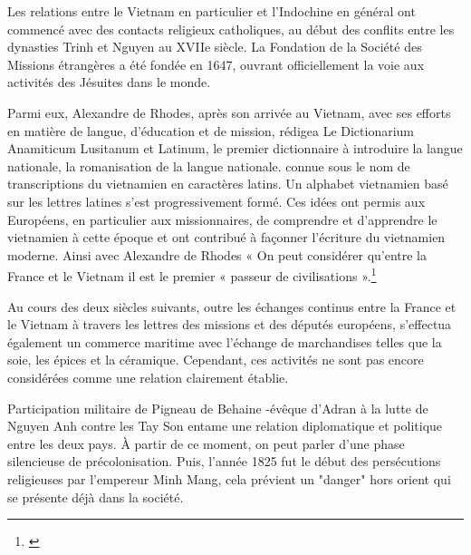 Les relations entre le Vietnam en particulier et l'Indochine en général ont commencé avec des contacts religieux catholiques, au début des conflits entre les dynasties Trinh et Nguyen au XVIIe siècle. La Fondation de la Société des Missions étrangères a été fondée en 1647, ouvrant officiellement la voie aux activités des Jésuites dans le monde.

Parmi eux, Alexandre de Rhodes, après son arrivée au Vietnam, avec ses efforts en matière de langue, d'éducation et de mission, rédigea Le Dictionarium Anamiticum Lusitanum et Latinum, le premier dictionnaire à introduire la langue nationale, la romanisation de la langue nationale. connue sous le nom de transcriptions du vietnamien en caractères latins. Un alphabet vietnamien basé sur les lettres latines s’est progressivement formé. Ces idées ont permis aux Européens, en particulier aux missionnaires, de comprendre et d’apprendre le vietnamien à cette époque et ont contribué à façonner l’écriture du vietnamien moderne. Ainsi avec Alexandre de Rhodes « On peut considérer qu’entre la France et le Vietnam il est le premier « passeur de civilisations ».\footnote{\cite{phil}}

Au cours des deux siècles suivants, outre les échanges continus entre la France et le Vietnam à travers les lettres des missions et des députés européens, s'effectua également un commerce maritime avec l'échange de marchandises telles que la soie, les épices et la céramique. Cependant, ces activités ne sont pas encore considérées comme une relation clairement établie.

Participation militaire de Pigneau de Behaine -évêque d'Adran à la lutte de Nguyen Anh contre les Tay Son entame une relation diplomatique et politique entre les deux pays. À partir de ce moment, on peut parler d’une phase silencieuse de précolonisation. Puis, l'année 1825 fut le début des persécutions religieuses par l'empereur Minh Mang, cela prévient un "danger" hors orient qui se présente déjà dans la société. 

